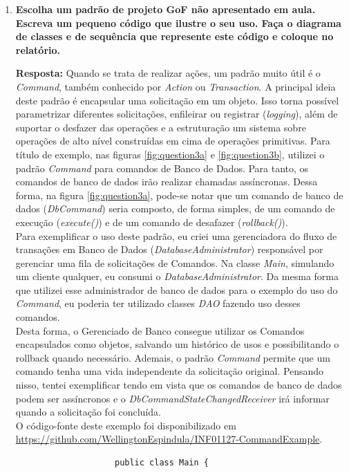 \documentclass[12pt, a4paper]{article}
\newcommand{\tit}[1]{\textit{#1}}
\newcommand{\tb}[1]{\textbf{#1}}
\newcommand{\question}[1]{\item \tb{#1}}
\newcommand{\answer}[1]{\par \tb{Resposta:} #1}
\begin{document}
\begin{enumerate}[label=\textbf{\arabic*.}]
        \question{Escolha um padrão de projeto GoF não apresentado em aula. Escreva um pequeno código que ilustre o seu uso. Faça o diagrama de classes e de sequência que represente este código e coloque no relatório. }
        \answer{
            Quando se trata de realizar ações, um padrão muito útil é o \tit{Command}, também conhecido por \tit{Action} ou  \tit{Transaction}. A principal ideia deste padrão é encapsular uma solicitação em um objeto. Isso torna possível parametrizar diferentes solicitações, enfileirar ou registrar (\tit{logging}), além de suportar o desfazer das operações e a estruturação um sistema sobre operações de alto nível construídas em cima de operações primitivas. Para título de exemplo, nas figuras \ref{fig:question3a} e \ref{fig:question3b}, utilizei o padrão \tit{Command} para comandos de Banco de Dados. Para tanto, os comandos de banco de dados irão realizar chamadas assíncronas. Dessa forma, na figura \ref{fig:question3a}, pode-se notar que um comando de banco de dados (\tit{DbCommand}) seria composto, de forma simples, de um comando de execução (\tit{execute()}) e de um comando de desafazer (\tit{rollback()}). \\
            Para exemplificar o uso deste padrão, eu criei uma gerenciadora do fluxo de transações em Banco de Dados (\tit{DatabaseAdministrator}) responsável por gerenciar uma fila de solicitações de Comandos. Na classe \tit{Main}, simulando um cliente qualquer, eu consumi o \tit{DatabaseAdministrator}. Da mesma forma que utilizei esse administrador de banco de dados para o exemplo do uso do \tit{Command}, eu poderia ter utilizado classes \tit{DAO} fazendo uso desses comandos. \\
            Desta forma, o Gerenciado de Banco consegue utilizar os Comandos encapsulados como objetos, salvando um histórico de usos e possibilitando o rollback quando necessário. Ademais, o padrão \tit{Command} permite que um comando tenha uma vida independente da solicitação original. Pensando nisso, tentei exemplificar tendo em vista que os comandos de banco de dados podem ser assíncronos e o \tit{DbCommandStateChangedReceiver} irá informar quando a solicitação foi concluída. \\
            O código-fonte deste exemplo foi disponibilizado em \url{https://github.com/WellingtonEspindula/INF01127-CommandExample}.
        }
        
        \clearpage
        \begin{lstlisting}
                    public class Main {


\end{lstlisting}
\end{enumerate}
\end{document}
